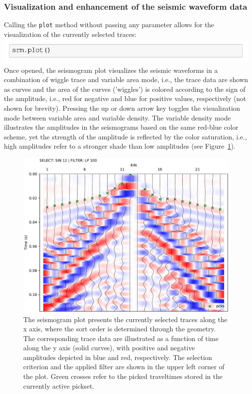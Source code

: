 \documentclass[a4paper,fleqn]{cas-sc}
\begin{document}
\subsubsection{Visualization and enhancement of the seismic waveform data}
Calling the \texttt{plot} method without passing any parameter allows for the visualization of the currently selected traces:
\newline
\includegraphics[width=.5\textwidth]{./figures/plot.pdf}
\newline
Once opened, the seismogram plot visualizes the seismic waveforms in a combination of wiggle trace and variable area mode, i.e., the trace data are shown as curves and the area of the curves ('wiggles') is colored according to the sign of the amplitude, i.e., red for negative and blue for positive values, respectively (not shown for brevity). Pressing the up or down arrow key toggles the visualization mode between variable area and variable density. The variable density mode illustrates the amplitudes in the seismograms based on the same red-blue color scheme, yet the strength of the amplitude is reflected by the color saturation, i.e., high amplitudes refer to a stronger shade than low amplitudes (see Figure~\ref{fig:srm_intro}).
\begin{figure}
	\centering
	\includegraphics[width=.75\textwidth]{figures/pickwindow_intro.pdf}
	\caption{The seismogram plot presents the currently selected traces along the x axis, where the sort order is determined through the geometry. The corresponding trace data are illustrated as a function of time along the y axis (solid curves), with positive and negative amplitudes depicted in blue and red, respectively. The selection criterion and the applied filter are shown in the upper left corner of the plot. Green crosses refer to the picked traveltimes stored in the currently active pickset.}
	\label{fig:srm_intro}
\end{figure}
\end{document}

